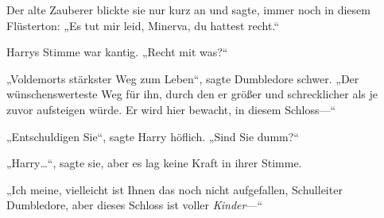 Der alte Zauberer blickte sie nur kurz an und sagte, immer noch in diesem Flüsterton:
„Es tut mir leid, Minerva, du hattest recht.“

Harrys Stimme war kantig.
„Recht mit was?“

„Voldemorts stärkster Weg zum Leben“, sagte Dumbledore schwer.
„Der wünschenswerteste Weg für ihn, durch den er größer und schrecklicher als je zuvor aufsteigen würde. Er wird hier bewacht, in diesem Schloss—“

„Entschuldigen Sie“, sagte Harry höflich.
„Sind Sie dumm?“

„Harry…“, sagte sie, aber es lag keine Kraft in ihrer Stimme.

„Ich meine, vielleicht ist Ihnen das noch nicht aufgefallen, Schulleiter Dumbledore, aber dieses Schloss ist voller \emph{Kinder}—“

